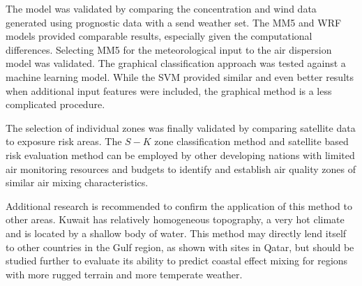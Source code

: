 The model was validated by comparing the concentration and wind data generated using prognostic data with a send weather set. The MM5 and WRF models provided comparable results, especially given the computational differences. Selecting MM5 for the meteorological input to the air dispersion model was validated. The graphical classification approach was tested against a machine learning model. While the SVM provided similar and even better results when additional input features were included, the graphical method is a less complicated procedure.

The selection of individual zones was finally validated by comparing satellite data to exposure risk areas.  The $S-K$ zone classification method and satellite based risk evaluation method can be employed by other developing nations with limited air monitoring resources and budgets to identify and establish air quality zones of similar air mixing characteristics.

Additional research is recommended to confirm the application of this method to other areas.  Kuwait has relatively homogeneous topography, a very hot climate and is located by a shallow body of water.  This method may directly lend itself to other countries in the Gulf region, as shown with sites in Qatar, but should be studied further to evaluate its ability to predict coastal effect mixing for regions with more rugged terrain and more temperate weather.





